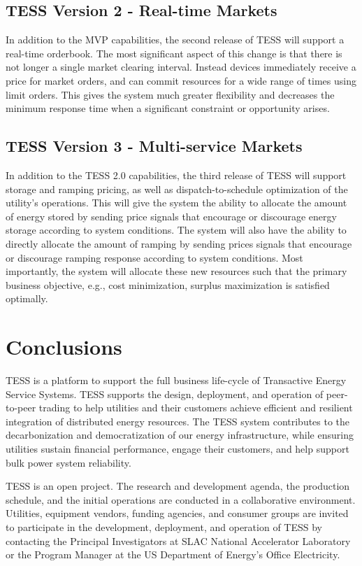 \documentclass[10pt,twocolumn]{article}
\begin{document}
\subsection{TESS Version 2 - Real-time Markets}

In addition to the MVP capabilities, the second release of TESS will support a real-time orderbook. The most significant aspect of this change is that there is not longer a single market clearing interval. Instead devices immediately receive a price for market orders, and can commit resources for a wide range of times using limit orders. This gives the system much greater flexibility and decreases the minimum response time when a significant constraint or opportunity arises.

\subsection{TESS Version 3 - Multi-service Markets}

In addition to the TESS 2.0 capabilities, the third release of TESS will support storage and ramping pricing, as well as dispatch-to-schedule optimization of the utility's operations. This will give the system the ability to allocate the amount of energy stored by sending price signals that encourage or discourage energy storage according to system conditions.  The system will also have the ability to directly allocate the amount of ramping by sending prices signals that encourage or discourage ramping response according to system conditions.  Most importantly, the system will allocate these new resources such that the primary business objective, e.g., cost minimization, surplus maximization is satisfied optimally.

\section{Conclusions}

TESS is a platform to support the full business life-cycle of Transactive Energy Service Systems.  TESS supports the design, deployment, and operation of peer-to-peer trading to help utilities and their customers achieve efficient and resilient integration of distributed energy resources.  The TESS system contributes to the decarbonization and democratization of our energy infrastructure, while ensuring utilities sustain financial performance, engage their customers, and help support bulk power system reliability.

TESS is an open project. The research and development agenda, the production schedule, and the initial operations are conducted in a collaborative environment. Utilities, equipment vendors, funding agencies, and consumer groups are invited to participate in the development, deployment, and operation of TESS by contacting the Principal Investigators at SLAC National Accelerator Laboratory or the Program Manager at the US Department of Energy's Office Electricity.
\end{document}
